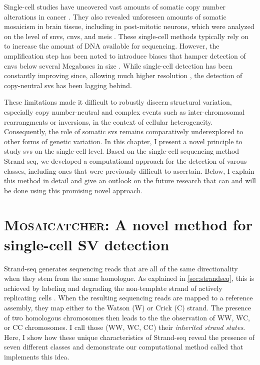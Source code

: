 Single-cell studies have uncovered vast amounts of somatic copy number
alterations in cancer \citep{Navin2011,Demeulemeester2016}. They also revealed
unforeseen amounts of somatic mosaicism in brain tissue, including in
post-mitotic neurons, which were analyzed on the level of \acp{snv}, \acp{cnv},
and \acp{mei} \citep{Lodato2015,Cai2014,Evrony2012}.
These single-cell methods typically rely on 
to increase the amount of DNA available for sequencing. However, the amplification step has been noted to
introduce biases that hamper detection of \acp{cnv} below several Megabases in
size \citep{Deleye2017}. While single-cell \cnv detection has been
constantly improving since, allowing much higher resolution
\citep{Garvin2015,Gao2016,Bakker2016,Knouse2016}, the detection of copy-neutral \acp{sv} has
been lagging behind.

These limitations made it difficult to robustly discern structural variation,
especially copy number-neutral and complex events such as inter-chromosomal
rearrangments or inversions, in the context of cellular
heterogeneity. Consequently, the role of somatic \acp{sv} remains comparatively
underexplored to other forms of genetic variation. In this chapter, I present a
novel principle to study \acp{sv} on the single-cell level. Based on the
single-cell sequencing method Strand-seq, we developed a computational approach
for the detection of varous \sv classes, including ones that were previously
difficult to ascertain. Below, I
explain this method in detail and give an outlook on the future research that
can and will be done using this promising novel approach.






\section{\textsc{Mosaicatcher}: A novel method for single-cell SV detection}
\label{sec:mosaic_mc}

Strand-seq generates sequencing reads that are all of the same directionality
when they stem from the same homologue. As explained in \cref{sec:strandseq},
this is achieved by labeling and degrading the non-template strand of
actively replicating cells \citep{Falconer2012,Sanders2017}. When the resulting sequencing reads are mapped to a
reference assembly, they map either to the Watson (W) or Crick (C) strand. The
presence of two homologous chromosomes then leads to the the observation of WW, WC, or CC
chromosomes. I call those (WW, WC, CC) their \emph{inherited strand states}.
Here, I show how these unique characteristics of Strand-seq reveal the presence
of seven different \sv classes and demonstrate our computational method called
\mc that implements this idea.




